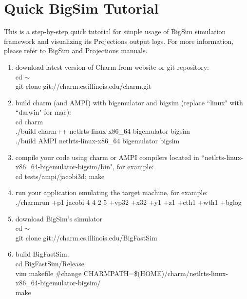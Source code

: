 \section{Quick BigSim Tutorial}
\label{sec:bigtutor}

This is a step-by-step quick tutorial for simple usage of BigSim simulation framework and visualizing its Projections output logs.
For more information, please refer to BigSim and Projections manuals.

\begin{enumerate}

\item download latest version of Charm from website or git repository:\\
        cd $\sim$ \\
        git clone git://charm.cs.illinois.edu/charm.git\\

\item build charm (and AMPI) with bigemulator and bigsim (replace ``linux" with ``darwin" for mac):\\
        cd charm\\
        ./build charm++ netlrts-linux-x86\_64 bigemulator bigsim\\
        ./build AMPI netlrts-linux-x86\_64 bigemulator bigsim\\

\item compile your code using charm or AMPI compilers located in ``netlrts-linux-x86\_64-bigemulator-bigsim/bin", for example:\\
        cd tests/ampi/jacobi3d; make\\

\item run your application emulating the target machine, for example:\\
        ./charmrun +p1 jacobi 4 4 2 5 +vp32 +x32 +y1 +z1 +cth1 +wth1 +bglog\\

\item download BigSim's simulator\\
        cd $\sim$\\
        git clone git://charm.cs.illinois.edu/BigFastSim\\

\item build BigFastSim:\\
        cd BigFastSim/Release\\
        vim makefile  \#change CHARMPATH=\$(HOME)/charm/netlrts-linux-x86\_64-bigemulator-bigsim/\\
        make\\


\end{enumerate}
